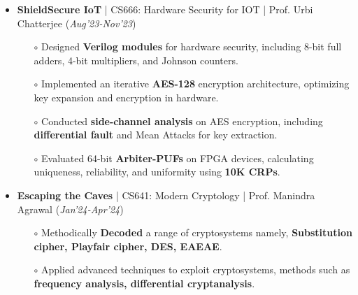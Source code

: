 \documentclass[10.8pt, a4paper]{extarticle}
\begin{document}
{\begin{itemize}
\begin{itemize}
\item[$\circ$] \textbf{Packet Analysis:} Analyzed PCAP files with Wireshark to uncover insights from SQL injection and XSS attacks.\\[-0.6cm]

	\end{itemize}

  \item \textbf{ShieldSecure IoT
} | CS666: Hardware Security for IOT | Prof. Urbi Chatterjee \href{https://github.com/vishalsavarna/ShieldSecure_IoT-CS666}{\faGithub{}}  \hfill(\textit{Aug'23-Nov'23})
	\\[-0.6cm]
	\begin{itemize}
	    \item[$\circ$] Designed \textbf{Verilog modules} for hardware security, including 8-bit full adders, 4-bit multipliers, and Johnson counters.\\[-0.6cm]
\item[$\circ$] Implemented an iterative \textbf{AES-128} encryption architecture, optimizing key expansion and encryption in hardware.\\[-0.6cm]

\item[$\circ$] Conducted \textbf{side-channel analysis} on AES encryption, including \textbf{differential fault} and Mean Attacks for key extraction.\\[-0.6cm]

\item[$\circ$] Evaluated 64-bit \textbf{Arbiter-PUFs} on FPGA devices, calculating uniqueness, reliability, and uniformity using \textbf{10K CRPs}.\\[-0.6cm]


	\end{itemize}


 \item \textbf{Escaping the Caves} | CS641: Modern Cryptology | Prof. Manindra Agrawal \href{https://github.com/vishalsavarna/Escaping_the_Caves-CS641}{\faGithub{}} \hfill(\textit{Jan'24-Apr'24})
    \\[-0.6cm]
	\begin{itemize}
	      \item [$\circ$] Methodically \textbf {Decoded} a range of cryptosystems namely, \textbf {Substitution cipher, Playfair cipher, DES, EAEAE}.\\[-0.6cm]
	      
	      \item [$\circ$] Applied advanced techniques to exploit cryptosystems, methods such as\textbf { frequency analysis, differential cryptanalysis}.\\[-0.6cm]
	\end{itemize}



\end{itemize}}
\end{document}
